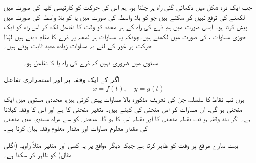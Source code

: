 جب ایک ذرہ شکل  میں دکھائی گئی راہ پر چلتا ہو، ہم اس کی حرکت کو کارتیسی کلیہ کی صورت میں لکھنے کی توقع نہیں کر سکتے ہیں جو  کو بلا واسطہ  کی صورت میں یا  کو بلا واسطہ  کی صورت میں پیش کرتا ہو۔ ایسی صورت میں ہم ذرے کی راہ کے ہر محدد کو وقت  کا تفاعل لکھ کر اس راہ کو ایک جوڑی مساوات ،  کی صورت میں لکھتے ہیں۔چونکہ یہ مساوات ہر لمحہ  پر ذرے کا مقام دیتے ہیں لہٰذا حرکت پر غور کے لئے یہ مساوات زیادہ مفید ثابت ہوتے ہیں۔
\begin{figure}
\centering
{}
\caption{مستوی  میں ضروری نہیں کہ ذرے کی راہ  یا  کا تفاعل ہو۔}
\label{شکل_مخروط_غیر_تفاعل_راہ}
\end{figure}
اگر  کے ایک وقفہ  پر  اور  استمراری تفاعل
\begin{align*}
x=f(t),\quad y=g(t)
\end{align*}
ہوں تب نقاط  کا سلسلہ، جن کی تعریف مذکورہ بالا مساوات پیش کرتی ہیں، محددی مستوی میں ایک منحنی ہو گی۔ ان مساوات کو اس منحنی کی  کہتے ہیں۔ متغیر  منحنی کا  ہے اور اس کا وقفہ   کہلاتا ہے۔ اگر  بند وقفہ   ہو تب نقطہ  منحنی کا  اور نقطہ  اس کا  ہو گا۔ منحنی کو  سے مراد مستوی میں منحنی کی مقدار معلوم مساوات اور مقدار معلوم وقفہ بیان کرنا ہے۔  

بہت سارے مواقع پر  وقت کو ظاہر کرتا ہے جبکہ دیگر مواقع پر یہ کسی اور متغیر مثلاً زاویہ (اگلی مثال) کو ظاہر کر سکتا ہے۔

